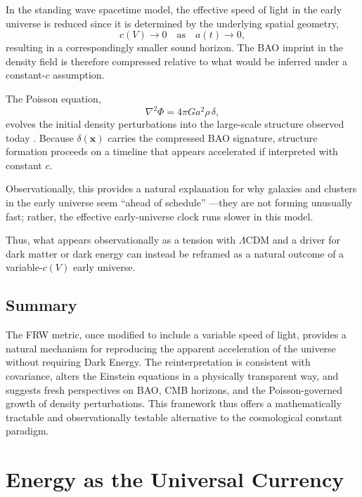 \documentclass[12pt]{article}
\begin{document}
In the standing wave spacetime model, the effective speed of light in the early universe is reduced since it is determined by the underlying spatial geometry,
\begin{equation}
c(V) \to 0 \quad \text{as} \quad a(t) \to 0,
\end{equation}
resulting in a correspondingly smaller sound horizon. The BAO imprint in the density field is therefore compressed relative to what would be inferred under a constant-$c$ assumption.

The Poisson equation,
\begin{equation}
\nabla^2 \Phi = 4 \pi G a^2 \rho \, \delta,
\end{equation}
evolves the initial density perturbations into the large-scale structure observed today \cite{peebles1980}. Because $\delta(\mathbf{x})$ carries the compressed BAO signature, structure formation proceeds on a timeline that appears accelerated if interpreted with constant $c$. 

Observationally, this provides a natural explanation for why galaxies and clusters in the early universe seem ``ahead of schedule'' \cite{adams2023, naidu2022}---they are not forming unusually fast; rather, the effective early-universe clock runs slower in this model.

Thus, what appears observationally as a tension with $\Lambda$CDM and a driver for dark matter or dark energy can instead be reframed as a natural outcome of a variable-$c(V)$ early universe.

\subsection{Summary}

The FRW metric, once modified to include a variable speed of light, provides a natural mechanism for reproducing the apparent acceleration of the universe without requiring Dark Energy. The reinterpretation is consistent with covariance, alters the Einstein equations in a physically transparent way, and suggests fresh perspectives on BAO, CMB horizons, and the Poisson-governed growth of density perturbations. This framework thus offers a mathematically tractable and observationally testable alternative to the cosmological constant paradigm.


\section{Energy as the Universal Currency}
\end{document}
